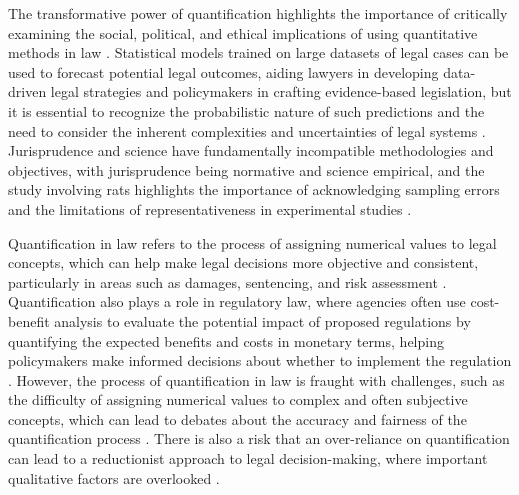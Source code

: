 The transformative power of quantification highlights the importance of critically examining the social, political, and ethical implications of using quantitative methods in law \cite{10.5040/9781350220645,10.1080/07329113.2015.1046739}. Statistical models trained on large datasets of legal cases can be used to forecast potential legal outcomes, aiding lawyers in developing data-driven legal strategies and policymakers in crafting evidence-based legislation, but it is essential to recognize the probabilistic nature of such predictions and the need to consider the inherent complexities and uncertainties of legal systems \cite{10.5040/9781350220645,10.1080/07329113.2015.1046739}. Jurisprudence and science have fundamentally incompatible methodologies and objectives, with jurisprudence being normative and science empirical, and the study involving rats highlights the importance of acknowledging sampling errors and the limitations of representativeness in experimental studies \cite{loevinger1949,nunes2018}.

Quantification in law refers to the process of assigning numerical values to legal concepts, which can help make legal decisions more objective and consistent, particularly in areas such as damages, sentencing, and risk assessment \cite{damages_quantification}. Quantification also plays a role in regulatory law, where agencies often use cost-benefit analysis to evaluate the potential impact of proposed regulations by quantifying the expected benefits and costs in monetary terms, helping policymakers make informed decisions about whether to implement the regulation \cite{cost_benefit_analysis,environmental_regulation}. However, the process of quantification in law is fraught with challenges, such as the difficulty of assigning numerical values to complex and often subjective concepts, which can lead to debates about the accuracy and fairness of the quantification process \cite{quantification_challenges}. There is also a risk that an over-reliance on quantification can lead to a reductionist approach to legal decision-making, where important qualitative factors are overlooked \cite{reductionist_approach}.

